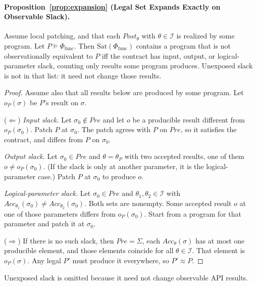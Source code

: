 \paragraph{Proposition~\ref{prop:expansion} (Legal Set Expands Exactly on Observable Slack).}
Assume local patching, and that each \(\mathit{Post}_\theta\) with
\(\theta \in \mathcal{I}\) is realized by some program. Let
\(P \models \Phi_{\text{func}}\). Then
\(\mathrm{Sat}(\Phi_{\text{func}})\) contains a program that is not
observationally equivalent to \(P\) iff the contract has input, output, or
logical-parameter slack, counting only results some program produces.
Unexposed slack is not in that list: it need not change those results.
\begin{proof}
Assume also that all results below are produced by some program.
Let \(o_P(\sigma)\) be \(P\)'s result on \(\sigma\).

(\(\Leftarrow\))
\emph{Input slack.} Let \(\sigma_0 \notin \mathit{Pre}\) and let \(o\) be a
producible result different from \(o_P(\sigma_0)\). Patch \(P\) at
\(\sigma_0\). The patch agrees with \(P\) on \(\mathit{Pre}\), so it
satisfies the contract, and differs from \(P\) on \(\sigma_0\).

\emph{Output slack.} Let \(\sigma_0 \in \mathit{Pre}\) and
\(\theta = \theta_P\) with two accepted results, one of them \(o \neq
o_P(\sigma_0)\). (If the slack is only at another parameter, it is the
logical-parameter case.) Patch \(P\) at \(\sigma_0\) to produce \(o\).

\emph{Logical-parameter slack.} Let \(\sigma_0 \in \mathit{Pre}\) and
\(\theta_1, \theta_2 \in \mathcal{I}\) with
\(\mathit{Acc}_{\theta_1}(\sigma_0) \neq \mathit{Acc}_{\theta_2}(\sigma_0)\).
Both sets are nonempty. Some accepted result \(o\) at one of those
parameters differs from \(o_P(\sigma_0)\). Start from a program for that
parameter and patch it at \(\sigma_0\).

(\(\Rightarrow\)) If there is no such slack, then \(\mathit{Pre} = \Sigma\),
each \(\mathit{Acc}_\theta(\sigma)\) has at most one producible element, and
those elements coincide for all \(\theta \in \mathcal{I}\). That element is
\(o_P(\sigma)\). Any legal \(P'\) must produce it everywhere, so
\(P' \approx P\).
\end{proof}

Unexposed slack is omitted because it need not change observable API results.

